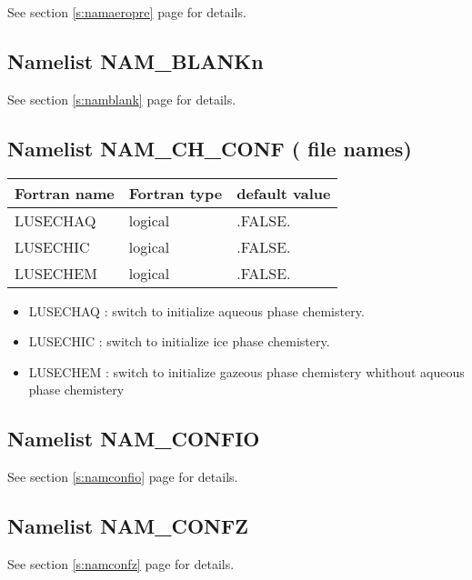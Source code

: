 See section \ref{s:namaeropre} page \pageref{s:namaeropre} for details.
			  
			  
\subsection{Namelist NAM\_BLANKn}
See section \ref{s:namblank} page \pageref{s:namblank} for details.

\subsection{Namelist NAM\_CH\_CONF ( file names)}

\begin{center}
\begin{tabular} {|l|l|l|}
\hline
Fortran name & Fortran type & default value\\
\hline
\hline
LUSECHAQ  & logical  & .FALSE.  \\
LUSECHIC  & logical  & .FALSE.   \\
LUSECHEM  & logical  & .FALSE.   \\

\hline
\end{tabular}
\end{center}

\begin{itemize}
\item LUSECHAQ : switch to initialize aqueous phase chemistery.
\item LUSECHIC : switch to initialize ice  phase chemistery.
\item LUSECHEM : switch to initialize gazeous phase chemistery whithout aqueous phase chemistery

\end{itemize}

\subsection{Namelist NAM\_CONFIO}
See section \ref{s:namconfio} page \pageref{s:namconfio} for details.

\subsection{Namelist NAM\_CONFZ}
See section \ref{s:namconfz} page \pageref{s:namconfz} for details.

